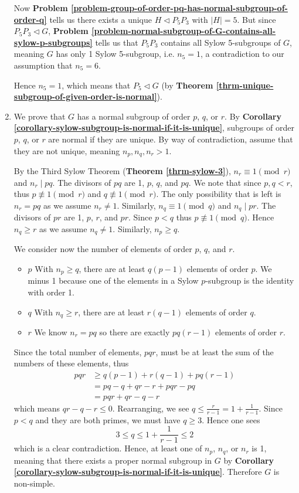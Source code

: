 \begin{enumerate}
    Now \textbf{Problem \ref{problem-group-of-order-pq-has-normal-subgroup-of-order-q}} tells us there exists a unique $H \lhd P_5P_3$ with $|H| = 5$. But since $P_5P_3 \lhd G$, \textbf{Problem \ref{problem-normal-subgroup-of-G-contains-all-sylow-p-subgroups}} tells us that $P_5P_3$ contains all Sylow 5-subgroups of $G$, meaning $G$ has only 1 Sylow 5-subgroup, i.e. $n_5 = 1$, a contradiction to our assumption that $n_5 = 6$.

    Hence $n_5 = 1$, which means that $P_5 \lhd G$ (by \textbf{Theorem \ref{thrm-unique-subgroup-of-given-order-is-normal}}).

    \item We prove that $G$ has a normal subgroup of order $p$, $q$, or $r$. By \textbf{Corollary \ref{corollary-sylow-subgroup-is-normal-if-it-is-unique}}, subgroups of order $p$, $q$, or $r$ are normal if they are unique. By way of contradiction, assume that they are not unique, meaning $n_p, n_q, n_r > 1$.
    
    By the Third Sylow Theorem (\textbf{Theorem \ref{thrm-sylow-3}}), $n_r \equiv 1 \pmod r$ and $n_r \mid pq$. The divisors of $pq$ are 1, $p$, $q$, and $pq$. We note that since $p, q < r$, thus $p \not\equiv 1 \pmod r$ and $q \not\equiv 1 \pmod r$. The only possibility that is left is $n_r = pq$ as we assume $n_r \neq 1$. Similarly, $n_q \equiv 1 \pmod q$ and $n_q \mid pr$. The divisors of $pr$ are 1, $p$, $r$, and $pr$. Since $p < q$ thus $p \not\equiv 1 \pmod q$. Hence $n_q \geq r$ as we assume $n_q \neq 1$. Similarly, $n_p \geq q$.
    
    We consider now the number of elements of order $p$, $q$, and $r$.
    \begin{itemize}
        \item $\boxed{p}$ With $n_p \geq q$, there are at least $q(p-1)$ elements of order $p$. We minus 1 because one of the elements in a Sylow $p$-subgroup is the identity with order 1.
        \item $\boxed{q}$ With $n_q \geq r$, there are at least $r(q-1)$ elements of order $q$.
        \item $\boxed{r}$ We know $n_r = pq$ so there are exactly $pq(r-1)$ elements of order $r$.
    \end{itemize}
    Since the total number of elements, $pqr$, must be at least the sum of the numbers of these elements, thus
    \begin{align*}
        pqr &\geq q(p-1) + r(q-1) + pq(r-1)\\
        &= pq - q + qr - r + pqr - pq\\
        &= pqr + qr - q - r
    \end{align*}
    which means $qr - q - r \leq 0$. Rearranging, we see $q \leq \frac{r}{r-1} = 1 + \frac{1}{r-1}$. Since $p < q$ and they are both primes, we must have $q \geq 3$. Hence one sees
    \[
        3 \leq q \leq 1 + \frac{1}{r-1} \leq 2
    \]
    which is a clear contradiction. Hence, at least one of $n_p$, $n_q$, or $n_r$ is 1, meaning that there exists a proper normal subgroup in $G$ by \textbf{Corollary \ref{corollary-sylow-subgroup-is-normal-if-it-is-unique}}. Therefore $G$ is non-simple.
\end{enumerate}

